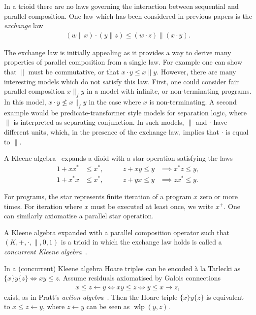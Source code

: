\documentclass{llncs}
\DeclareMathOperator{\wlp}{wlp}
\begin{document}
In a trioid there are no laws governing the interaction between
sequential and parallel composition. One law which has been considered
in previous papers is the \emph{exchange} law~\cite{hoare_concurrent_2011,hoare_locality_2011}
\begin{align*}
  (w \| x) \cdot (y \| z) \le (w \cdot z) \| (x \cdot y).
\end{align*}

The exchange law is initially appealing as it provides a way to derive
many properties of parallel composition from a single law. For example
one can show that $\|$ must be commutative, or that $x\cdot y \le
x\|y$. However, there are many interesting models which do not satisfy
this law. First, one could consider fair parallel composition
$x\parallel_f y$ in a model with infinite, or non-terminating
programs. In this model, $x \cdot y \not\leq x \parallel_f y$ in the
case where $x$ is non-terminating. A second example would be
predicate-transformer style models for separation logic, where $\|$ is
interpreted as separating conjunction. In such models, $\|$ and
$\cdot$ have different units, which, in the presence of the exchange
law, implies that $\cdot$ is equal to $\|$.

A Kleene algebra~\cite{kozen_completeness_1994} expands a dioid with a star operation satisfying the laws
\begin{align*}
  1 + xx^* &\le x^*, &\qquad z + xy \le y &\implies x^*z \le y,\\
  1 + x^*x &\le x^*, &\qquad z + yx \le y &\implies zx^* \le y.
\end{align*}

For programs, the star represents finite iteration of a program $x$
zero or more times. For iteration where $x$ must be executed at least
once, we write $x^+$. One can similarly axiomatise a parallel star
operation.

A Kleene algebra expanded with a parallel composition operator such
that $(K,+,\cdot,\|,0,1)$ is a trioid in which the exchange law holds
is called a \emph{concurrent Kleene algebra}~\cite{hoare_concurrent_2011}.

In a (concurrent) Kleene algebra Hoare triples can be encoded \`a la
Tarlecki as $\{x\}y\{z\} \iff xy \le z$. Assume residuals axiomatised
by Galois connections
\begin{align*}
 x \le z \leftarrow y \iff xy \le z \iff y \le x \rightarrow z,
\end{align*}
exist, as in Pratt's \emph{action
  algebra}~\cite{pratt_action_1990}. Then the Hoare triple
$\{x\}y\{z\}$ is equivalent to $x \le z \leftarrow y$, where $z
\leftarrow y$ can be seen as $\wlp(y,z)$.
\end{document}
